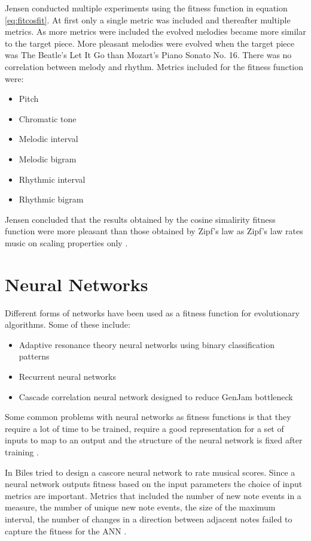 Jensen conducted multiple experiments using the fitness function in equation \ref{eq:fitcosfit}. At first only a single metric was included and thereafter multiple metrics. As more metrics were included the evolved melodies became more similar to the target piece. More pleasant melodies were evolved when the target piece was The Beatle's Let It Go than Mozart's Piano Sonato No. 16. There was no correlation between melody and rhythm.
Metrics included for the fitness function were:
\begin{itemize}
\item Pitch
\item Chromatic tone
\item Melodic interval
\item Melodic bigram
\item Rhythmic interval
\item Rhythmic bigram
\end{itemize}
Jensen concluded that the results obtained by the cosine simalirity fitness function were more pleasant than those obtained by Zipf's law as Zipf's law rates music on scaling properties only \cite{Dostal2013}.



\section{Neural Networks} \label{sec:ANN_fitness}
Different forms of networks have been used as a fitness function for evolutionary algorithms.
Some of these include:
\begin{itemize}
\item Adaptive resonance theory neural networks using binary classification patterns \cite{Burton97geneticalgorithm}
\item Recurrent neural networks
\item Cascade correlation neural network designed to reduce GenJam bottleneck \cite{Biles1996}
\end{itemize}

Some common problems with neural networks as fitness functions is that they require a lot of time to be trained, require a good representation for a set of inputs to map to an output and the structure of the neural network is fixed after training \cite{Burton97geneticalgorithm}. 

In \cite{Biles1996} Biles tried to design a cascore neural network to rate musical scores. Since a neural network outputs fitness based on the input parameters the choice of input metrics are important.
Metrics that included the number of new note events in a measure, the number of unique new note events, the size of the maximum interval, the number of changes in a direction between adjacent notes failed to capture the fitness for the \ac{ANN} \cite{Biles1996}.

